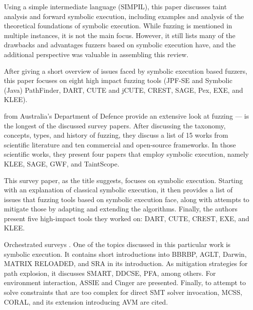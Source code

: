 \documentclass{article}
\begin{document}
\begin{multicols}{2}
  Using a simple intermediate language (SIMPIL), this paper discusses taint analysis and forward symbolic execution, including examples and analysis of the theoretical foundations of symbolic execution. While fuzzing is mentioned in multiple instances, it is not the main focus. However, it still lists many of the drawbacks and advantages fuzzers based on symbolic execution have, and the additional perspective was valuable in assembling this review.

  After giving a short overview of issues faced by symbolic execution based fuzzers, this paper focuses on eight high impact fuzzing tools (JPF-SE and Symbolic (Java) PathFinder\cite{JPFSE, JavaPathFinder}, DART\cite{DART}, CUTE\cite{CUTE} and jCUTE\cite{ExplicitPathModelChecking}, CREST\cite{CREST}, SAGE\cite{SAGE}, Pex\cite{Pex}, EXE\cite{EXE}, and KLEE\cite{KLEE}).

  \citeauthor{FuzzingTheStateOfTheArt} from Australia's Department of Defence provide an extensive look at fuzzing —  is the longest of the discussed survey papers. After discussing the taxonomy, concepts, types, and history of fuzzing, they discuss a list of 15 works from scientific literature and ten commercial and open-source frameworks. In those scientific works, they present four papers that employ symbolic execution, namely KLEE\cite{KLEE}, SAGE\cite{SAGE}, GWF\cite{GWF}, and TaintScope\cite{TaintScope}.

  This survey paper, as the title suggests, focuses on symbolic execution. Starting with an explanation of classical symbolic execution, it then provides a list of issues that fuzzing tools based on symbolic execution face, along with attempts to mitigate those by adapting and extending the algorithms. Finally, the authors present five high-impact tools they worked on: DART\cite{DART}, CUTE\cite{CUTE}, CREST\cite{CREST}, EXE\cite{EXE}, and KLEE\cite{KLEE}.

  Orchestrated surveys \cite{Orchestrated}. One of the topics discussed in this particular work is symbolic execution. It contains short introductions into BBRBP\cite{BBRBP}, AGLT\cite{AGLT}, Darwin\cite{Darwin}, MATRIX RELOADED\cite{MATRIXRELOADED}, and SRA\cite{SRA} in its introduction. As mitigation strategies for path explosion, it discusses SMART\cite{SMART}, DDCSE\cite{DDCSE}, PFA\cite{PFA}, among others. For environment interaction, ASSIE\cite{ASSIE} and Cinger\cite{Cinger} are presented. Finally, to attempt to solve constraints that are too complex for direct SMT solver invocation, MCSS\cite{MCSS}, CORAL\cite{CORAL}, and its extension introducing AVM\cite{CORALAVM} are cited.


\end{multicols}
\end{document}

